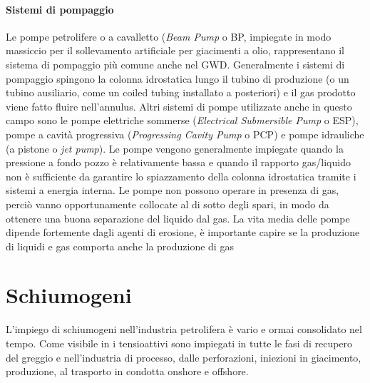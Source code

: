 \paragraph{Sistemi di pompaggio}
Le pompe petrolifere o a cavalletto (\textit{Beam Pump} o BP, impiegate in modo massiccio per il sollevamento artificiale per giacimenti a olio, rappresentano il sistema di pompaggio più comune anche nel GWD. Generalmente i sistemi di pompaggio spingono la colonna idrostatica lungo il tubino di produzione (o un tubino ausiliario, come un coiled tubing installato a posteriori) e il gas prodotto viene fatto fluire nell'annulus. Altri sistemi di pompe utilizzate anche in questo campo sono le pompe elettriche sommerse (\textit{Electrical Submersible Pump} o  ESP), pompe a cavità progressiva (\textit{Progressing Cavity Pump} o PCP) e pompe idrauliche (a pistone o \textit{jet pump}). Le pompe vengono generalmente impiegate quando la pressione a fondo pozzo è relativamente bassa e quando il rapporto gas/liquido non è sufficiente da garantire lo spiazzamento della colonna idrostatica tramite i sistemi a energia interna. Le pompe non possono operare in presenza di gas, perciò vanno opportunamente collocate al di sotto degli spari, in modo da ottenere una buona separazione del liquido dal gas. La vita media delle pompe dipende fortemente dagli agenti di erosione, è importante capire se la produzione di liquidi e gas comporta anche la produzione di gas

\section{Schiumogeni}
L'impiego di schiumogeni nell'industria petrolifera è vario e ormai consolidato nel tempo. Come visibile in  i tensioattivi sono impiegati in tutte le fasi di recupero del greggio e nell'industria di processo, dalle perforazioni, iniezioni in giacimento, produzione, al trasporto in condotta onshore e offshore.


